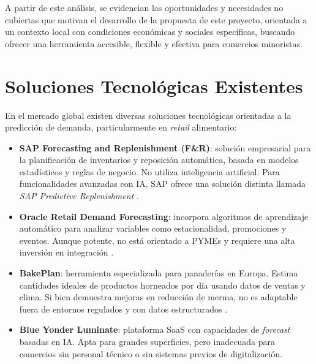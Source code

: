 A partir de este análisis, se evidencian las oportunidades y necesidades no cubiertas que motivan el desarrollo de la propuesta de este proyecto, orientada a un contexto local con condiciones económicas y sociales específicas, buscando ofrecer una herramienta accesible, flexible y efectiva para comercios minoristas.

\section{Soluciones Tecnológicas Existentes}

En el mercado global existen diversas soluciones tecnológicas orientadas a la predicción de demanda, particularmente en \textit{retail} alimentario:

\begin{itemize}
    \item \textbf{SAP Forecasting and Replenishment (F\&R)}: solución empresarial para la planificación de inventarios y reposición automática, basada en modelos estadísticos y reglas de negocio. No utiliza inteligencia artificial. Para funcionalidades avanzadas con IA, SAP ofrece una solución distinta llamada \textit{SAP Predictive Replenishment} \parencite{sap2025}.
    
    \item \textbf{Oracle Retail Demand Forecasting}:  incorpora algoritmos de aprendizaje automático para analizar variables como estacionalidad, promociones y eventos. Aunque potente, no está orientado a PYMEs y requiere una alta inversión en integración \parencite{oracle2021}.
    
    \item \textbf{BakePlan}: herramienta especializada para panaderías en Europa. Estima cantidades ideales de productos horneados por día usando datos de ventas y clima. Si bien demuestra mejoras en reducción de merma, no es adaptable fuera de entornos regulados y con datos estructurados \parencite{netherlands2019}.
    
    \item \textbf{Blue Yonder Luminate}: plataforma SaaS con capacidades de \textit{forecast} basadas en IA. Apta para grandes superficies, pero inadecuada para comercios sin personal técnico o sin sistemas previos de digitalización.
\end{itemize}

